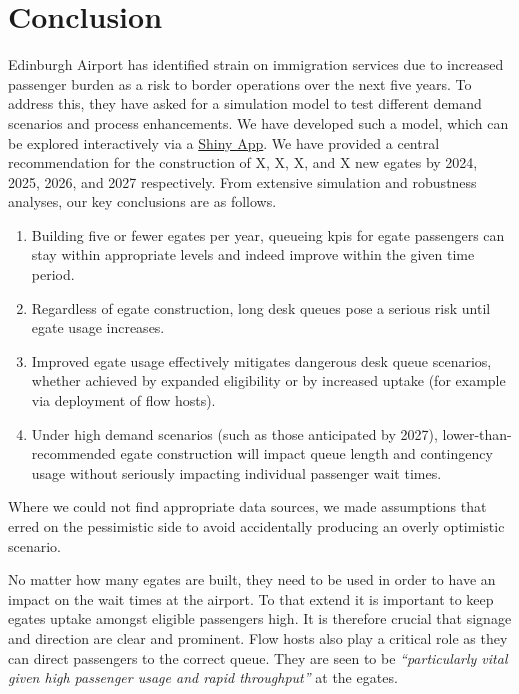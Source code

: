 \documentclass[10pt]{article}
\begin{document}
\section{Conclusion}
Edinburgh Airport has identified strain on immigration services due to increased passenger burden as a risk to border operations over the next five years. To address this, they have asked for a simulation model to test different demand scenarios and process enhancements. We have developed such a model, which can be explored interactively via a \href{app_url}{Shiny App}. We have provided a central recommendation for the construction of X, X, X, and X new \glspl{egate} by 2024, 2025, 2026, and 2027 respectively. From extensive simulation and robustness analyses, our key conclusions are as follows.
\begin{enumerate}

    \item Building five or fewer \glspl{egate} per year, queueing \glspl{kpi} for \gls{egate} passengers can stay within appropriate levels and indeed improve within the given time period.
    \item Regardless of \gls{egate} construction, long desk queues pose a serious risk until \gls{egate} usage increases. 
    \item Improved \gls{egate} usage effectively mitigates dangerous desk queue scenarios, whether achieved by expanded eligibility or by increased uptake (for example via deployment of flow hosts).
    \item Under high demand scenarios (such as those anticipated by 2027), lower-than-recommended \gls{egate} construction will impact queue length and contingency usage without seriously impacting individual passenger wait times.
\end{enumerate}



Where we could not find appropriate data sources, we made assumptions that erred on the pessimistic side to avoid accidentally producing an overly optimistic scenario.

No matter how many \glspl{egate} are built, they need to be used in order to have an impact on the wait times at the airport. To that extend it is important to keep \glspl{egate} uptake amongst eligible passengers high. It is therefore crucial that signage and direction are clear and prominent. Flow hosts also play a critical role as they can direct passengers to the correct queue. They are seen to be \textit{``particularly vital given high passenger usage and rapid throughput''} \cite[][paragraph 6.28]{Inspection_eGates} at the \glspl{egate}.
\end{document}
